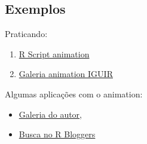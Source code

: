 \subsection{Exemplos}

\begin{frame}

  Praticando:
  \begin{enumerate}
  \item \href{run:./R/animation/animation.R}{R Script animation}
  \item \href{run:./animation/animation.html}{Galeria animation IGUIR}
  \end{enumerate}
  
  \vspace{0.5cm}
  Algumas aplicações com o animation:
  \begin{itemize}
  \item \href{http://vis.supstat.com/categories.html\#animation-ref}{Galeria
      do autor},
  \item \href{http://www.r-bloggers.com/?s=animation}{Busca no R
      Bloggers}
  \end{itemize}

\end{frame}
